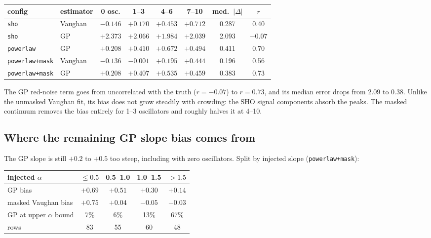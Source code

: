 \documentclass[11pt]{article}
\newcommand{\code}[1]{\texttt{#1}}
\begin{document}
\begin{center}
\begin{tabular}{llcccccc}
\toprule
config & estimator & 0 osc. & 1--3 & 4--6 & 7--10 & med.\ $|\Delta|$ & $r$ \\
\midrule
\code{sho}           & Vaughan & $-0.146$ & $+0.170$ & $+0.453$ & $+0.712$ & 0.287 & 0.40 \\
\code{sho}           & GP      & $+2.373$ & $+2.066$ & $+1.984$ & $+2.039$ & 2.093 & $-0.07$ \\
\code{powerlaw}      & GP      & $+0.208$ & $+0.410$ & $+0.672$ & $+0.494$ & 0.411 & 0.70 \\
\code{powerlaw+mask} & Vaughan & $-0.136$ & $-0.001$ & $+0.195$ & $+0.444$ & 0.196 & 0.56 \\
\code{powerlaw+mask} & GP      & $+0.208$ & $+0.407$ & $+0.535$ & $+0.459$ & 0.383 & 0.73 \\
\bottomrule
\end{tabular}
\end{center}

The GP red-noise term goes from uncorrelated with the truth ($r=-0.07$) to $r = 0.73$, and
its median error drops from 2.09 to 0.38. Unlike the unmasked Vaughan fit, its bias does
not grow steadily with crowding: the SHO signal components absorb the peaks. The masked
continuum removes the bias entirely for 1--3 oscillators and roughly halves it at 4--10.

\subsection{Where the remaining GP slope bias comes from}

The GP slope is still $+0.2$ to $+0.5$ too steep, including with zero oscillators. Split by
injected slope (\code{powerlaw+mask}):

\begin{center}
\begin{tabular}{lcccc}
\toprule
injected $\alpha$ & $\le 0.5$ & 0.5--1.0 & 1.0--1.5 & $>1.5$ \\
\midrule
GP bias               & $+0.69$ & $+0.51$ & $+0.30$ & $+0.14$ \\
masked Vaughan bias   & $+0.75$ & $+0.04$ & $-0.05$ & $-0.03$ \\
GP at upper $\alpha$ bound & 7\% & 6\% & 13\% & 67\% \\
rows & 83 & 55 & 60 & 48 \\
\bottomrule
\end{tabular}
\end{center}
\end{document}
